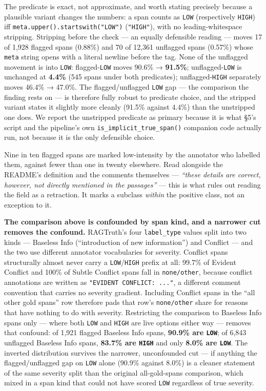\documentclass[11pt]{article}
\newcounter{none}
\begin{document}
The predicate is exact, not approximate, and worth stating precisely because a plausible
variant changes the numbers: a span counts as \texttt{LOW} (respectively \texttt{HIGH}) iff
\texttt{meta.upper().startswith("LOW")} (\texttt{"HIGH"}), with no leading-whitespace stripping. Stripping
before the check --- an equally defensible reading --- moves 17 of 1,928 flagged spans (0.88\%)
and 70 of 12,361 unflagged spans (0.57\%) whose \texttt{meta} string opens with a literal newline
before the tag. None of the unflagged movement is into \texttt{LOW}: flagged-\texttt{LOW} moves 90.6\% →
\textbf{91.5\%}; unflagged-\texttt{LOW} is unchanged at \textbf{4.4\%} (545 spans under both predicates);
unflagged-\texttt{HIGH} separately moves 46.4\% → 47.0\%. The flagged/unflagged \texttt{LOW} gap --- the
comparison the finding rests on --- is therefore fully robust to predicate choice, and the
stripped variant states it slightly more cleanly (91.5\% against 4.4\%) than the unstripped one
does. We report the unstripped predicate as primary because it is what §5's script and the
pipeline's own \texttt{is\_implicit\_true\_span()} companion code actually run, not because it is the
only defensible choice.

Nine in ten flagged spans are marked low-intensity by the annotator who labelled them,
against fewer than one in twenty elsewhere. Read alongside the README's definition and the
comments themselves --- \emph{``these details are correct, however, not directly mentioned in the
passages''} --- this is what rules out reading the field as a retraction. It marks a subclass
\emph{within} the positive class, not an exception to it.

\textbf{The comparison above is confounded by span kind, and a narrower cut removes the
confound.} RAGTruth's four \texttt{label\_type} values split into two kinds --- Baseless Info
(``introduction of new information'') and Conflict --- and the two use different annotator
vocabularies for severity. Conflict spans structurally almost never carry a \texttt{LOW}/\texttt{HIGH}
prefix at all: 99.7\% of Evident Conflict and 100\% of Subtle Conflict spans fall in
\texttt{none/other}, because conflict annotations are written as \texttt{"EVIDENT\ CONFLICT:\ ..."}, a
different comment convention that carries no severity gradient. Including Conflict spans in
the ``all other gold spans'' row therefore pads that row's \texttt{none/other} share for reasons that
have nothing to do with severity. Restricting the comparison to Baseless Info spans only ---
where both \texttt{LOW} and \texttt{HIGH} are live options either way --- removes that confound: of 1,921
flagged Baseless Info spans, \textbf{90.9\% are \texttt{LOW}}; of 6,843 unflagged Baseless Info spans,
\textbf{83.7\% are \texttt{HIGH}} and only \textbf{8.0\% are \texttt{LOW}}. The inverted distribution survives the
narrower, unconfounded cut --- if anything the flagged/unflagged gap on \texttt{LOW} alone (90.9\%
against 8.0\%) is a cleaner statement of the same severity split than the original
all-gold-spans comparison, which mixed in a span kind that could not have scored \texttt{LOW}
regardless of true severity.
\end{document}
